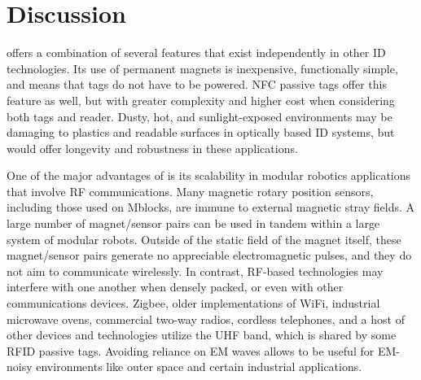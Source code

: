 \section{Discussion}
\label{sec:Discussion}

\tagName offers a combination of several features that exist independently in other ID technologies. Its use of permanent magnets is inexpensive, functionally simple, and means that tags do not have to be powered. NFC passive tags offer this feature as well, but with greater complexity and higher cost when considering both tags and reader. Dusty, hot, and sunlight-exposed environments may be damaging to plastics and readable surfaces in optically based ID systems, but \tagName would offer longevity and robustness in these applications.

One of the major advantages of \tagName is its scalability in modular robotics applications that involve RF communications. Many magnetic rotary position sensors, including those used on Mblocks, are immune to external magnetic stray fields. A large number of magnet/sensor pairs can be used in tandem within a large system of modular robots. Outside of the static field of the magnet itself, these magnet/sensor pairs generate no appreciable electromagnetic pulses, and they do not aim to communicate wirelessly. In contrast, RF-based technologies may interfere with one another when densely packed, or even with other communications devices. Zigbee, older implementations of WiFi, industrial microwave ovens, commercial two-way radios, cordless telephones, and a host of other devices and technologies utilize the UHF band, which is shared by some RFID passive tags. Avoiding reliance on EM waves allows \tagName to be useful for EM-noisy environments like outer space and certain industrial applications.
